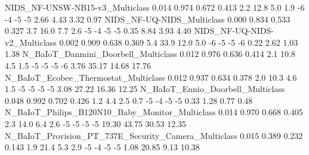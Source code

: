 NIDS_NF-UNSW-NB15-v3_Multiclass                                          0.014      0.974       0.672      0.413                   2.2                  12.8                    5.0                   1.9              -6              -4               -5              -5               2.66               4.43                3.32               0.97
NIDS_NF-UQ-NIDS_Multiclass                                               0.000      0.834       0.533      0.327                   3.7                  16.0                    7.7                   2.6              -5              -4               -5              -5               0.35               8.84                3.93               4.40
NIDS_NF-UQ-NIDS-v2_Multiclass                                            0.002      0.909       0.638      0.369                   5.4                  33.9                   12.0                   5.0              -6              -5               -5              -6               0.22               2.62                1.03               1.38
N_BaIoT_Danmini_Doorbell_Multiclass                                      0.012      0.976       0.636      0.414                   2.1                  10.8                    4.5                   1.5              -5              -5               -5              -6               3.76              35.17               14.68              17.76
N_BaIoT_Ecobee_Thermostat_Multiclass                                     0.012      0.937       0.634      0.378                   2.0                  10.3                    4.6                   1.5              -5              -5               -5              -5               3.08              27.22               16.36              12.25
N_BaIoT_Ennio_Doorbell_Multiclass                                        0.048      0.992       0.702      0.426                   1.2                   4.4                    2.5                   0.7              -5              -4               -5              -5               0.33               1.28                0.77               0.48
N_BaIoT_Philips_B120N10_Baby_Monitor_Multiclass                          0.014      0.970       0.668      0.405                   2.3                  14.0                    6.4                   2.6              -5              -5               -5              -5              19.30              43.75               30.53              12.35
N_BaIoT_Provision_PT_737E_Security_Camera_Multiclass                     0.015      0.389       0.232      0.143                   1.9                  21.4                    5.3                   2.9              -5              -4               -5              -5               1.08              20.85                9.13              10.38
